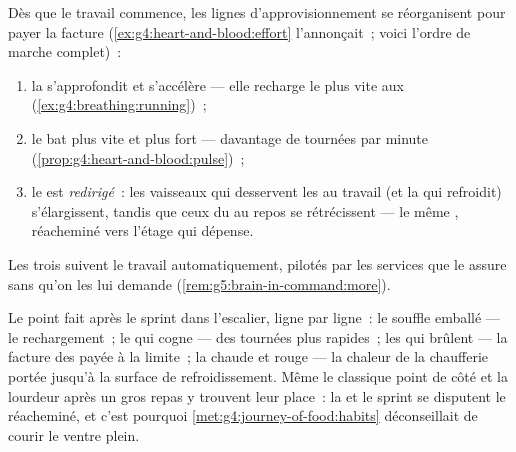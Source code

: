 \begin{proposition}\label{prop:g7:organs-at-work:supply}
Dès que le travail commence, les lignes d'approvisionnement se
réorganisent pour payer la facture
(\cref{ex:g4:heart-and-blood:effort} l'annonçait~; voici l'ordre de
marche complet)~:
\begin{enumerate}
  \item la \emph{} s'approfondit et s'accélère --- elle
        recharge le  plus vite aux 
        (\cref{ex:g4:breathing:running})~;
  \item le \emph{} bat plus vite et plus fort --- davantage de
        tournées par minute
        (\cref{prop:g4:heart-and-blood:pulse})~;
  \item le  est \emph{redirigé}~: les vaisseaux qui desservent
        les  au travail (et la  qui refroidit)
        s'élargissent, tandis que ceux du  au repos se
        rétrécissent --- le même , réacheminé vers l'étage qui
        dépense.
\end{enumerate}
Les trois suivent le travail automatiquement, pilotés par les
services que le  assure sans qu'on les lui demande
(\cref{rem:g5:brain-in-command:more}).
\end{proposition}
\admitted

\begin{example}\label{ex:g7:organs-at-work:felt}
Le point fait après le sprint dans l'escalier, ligne par ligne~: le
souffle emballé --- le rechargement~; le  qui cogne --- des
tournées plus rapides~; les  qui brûlent --- la facture des
 payée à la limite~; la  chaude et rouge --- la chaleur
de la chaufferie portée jusqu'à la surface de refroidissement. Même
le classique point de côté et la lourdeur après un gros repas y
trouvent leur place~: la  et le sprint se disputent le 
réacheminé, et c'est pourquoi
\cref{met:g4:journey-of-food:habits} déconseillait de courir le
ventre plein.
\end{example}

